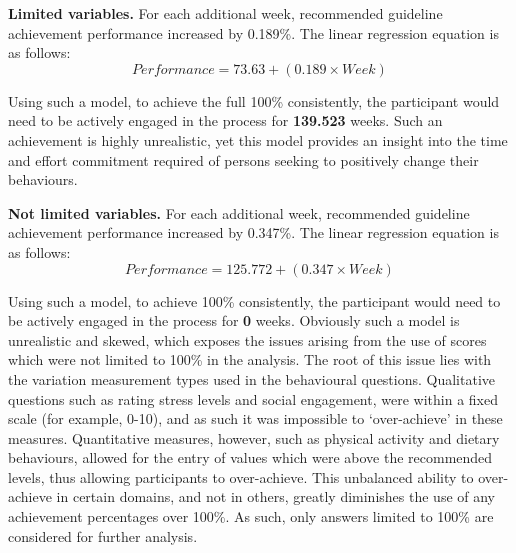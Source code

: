 \textbf{Limited variables.}
For each additional week, recommended guideline achievement performance increased by 0.189\%. The linear regression equation is as follows:
\begin{equation}
Performance = 73.63 + \left(0.189 \times Week\right)
          \label{eq: calc-performance-limited-behaviour-change}
\end{equation}

Using such a model, to achieve the full 100\% consistently, the participant would need to be actively engaged in the process for \textbf{139.523} weeks. Such an achievement is highly unrealistic, yet this model provides an insight into the time and effort commitment required of persons seeking to positively change their behaviours.

\textbf{Not limited variables.}
For each additional week, recommended guideline achievement performance increased by 0.347\%. The linear regression equation is as follows:
\begin{equation}
Performance = 125.772 + \left(0.347 \times Week\right)
          \label{eq: calc-performance-notlimited-behaviour-change}
\end{equation}

Using such a model, to achieve 100\% consistently, the participant would need to be actively engaged in the process for \textbf{0} weeks. Obviously such a model is unrealistic and skewed, which exposes the issues arising from the use of scores which were not limited to 100\% in the analysis. The root of this issue lies with the variation measurement types used in the behavioural questions. Qualitative questions such as rating stress levels and social engagement, were within a fixed scale (for example, 0-10), and as such it was impossible to `over-achieve' in these measures. Quantitative measures, however, such as physical activity and dietary behaviours, allowed for the entry of values which were above the recommended levels, thus allowing participants to over-achieve. This unbalanced ability to over-achieve in certain domains, and not in others, greatly diminishes the use of any achievement percentages over 100\%. As such, only answers limited to 100\% are considered for further analysis.

